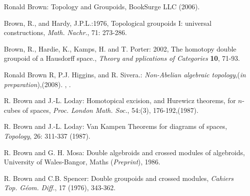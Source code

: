 \documentclass[12pt]{article}
\theoremstyle{plain}
\theoremstyle{definition}
\numberwithin{equation}{section}
\begin{document}
\begin{thebibliography}{9}
Ronald Brown: Topology and Groupoids, BookSurge LLC (2006).

Brown, R., and Hardy, J.P.L.:1976, Topological groupoids I:
universal constructions, \emph{Math. Nachr.}, 71: 273-286.

Brown, R., Hardie, K., Kamps, H. and T. Porter: 2002, The homotopy
double groupoid of a Hausdorff space., 
\emph{Theory and pplications of Categories} \textbf{10}, 71-93.

Ronald Brown R, P.J. Higgins, and R. Sivera.: {\em Non-Abelian algebraic topology},({\em in preparation}),(2008).
, .

R. Brown and J.-L. Loday: Homotopical excision, and Hurewicz theorems, for $n$-cubes of spaces, 
\emph{Proc. London Math. Soc.}, 54:(3), 176-192,(1987).

R. Brown and J.-L. Loday: Van Kampen Theorems for diagrams of spaces, \emph{Topology}, 26: 311-337 (1987).

R. Brown and G. H. Mosa: Double algebroids and crossed modules of algebroids, University of Wales-Bangor, Maths 
({\em Preprint}), 1986.

R. Brown and C.B. Spencer: Double groupoids and crossed modules, {\em Cahiers Top. G\'eom. Diff.}, 17 (1976), 343-362.

\end{thebibliography}

\end{document}

